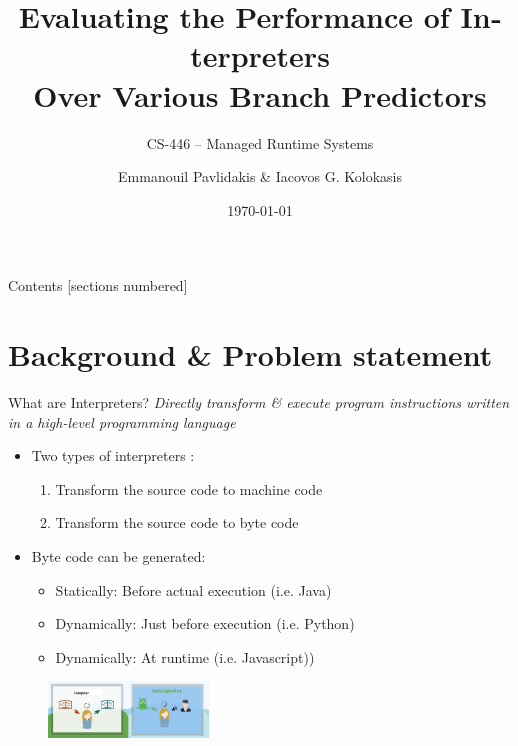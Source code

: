\documentclass[10pt]{beamer}
\title{\textlatin{Evaluating the Performance of Interpreters\\Over Various Branch Predictors}}
\subtitle{CS-446 -- Managed Runtime Systems}
\date{\today}
\author{Emmanouil Pavlidakis \& Iacovos G. Kolokasis}
\institute{Computer Science Department \\ University Of Crete}
\begin{document}
{
\maketitle
}

{
\begin{frame}{Contents}
  [sections numbered]
  \tableofcontents[hideallsubsections]
\end{frame}
}

\section{Background \& Problem statement}

\begin{frame}{What are Interpreters?}
	\textit{Directly transform \& execute program instructions written in a high-level programming language}
    \begin{itemize}
    	\item {Two types of interpreters : }
    	\begin{enumerate}
    		\item {Transform the source code to machine code}
    		\item {Transform the source code to byte code}
    	\end{enumerate}	
        \item {Byte code can be generated: }
	         \begin{itemize}
	         	\item{Statically: Before actual execution (i.e. Java)}
	         	\item{Dynamically: Just before execution (i.e. Python)}
	         	\item{Dynamically: At runtime (i.e. Javascript))}
	         \end{itemize}
    \end{itemize}
    \begin{figure}
	    \includegraphics[height=1.5cm]{figures/interVSComp.jpg}
    \end{figure}
\end{frame}
\end{document}
